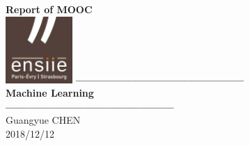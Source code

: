 \documentclass[a4paper]{article}
\begin{document}
\hypersetup{pageanchor=false,
             bookmarksnumbered=true,
             pdfencoding=unicode
            }
\begin{titlepage}
\vspace*{7cm}
\begin{center}%
{\LARGE \textbf{Report of MOOC} }\\
\vskip 1cm
\includegraphics[width=1in]{Logo_ENSIIE.png}
\vskip 1cm
{\Huge \textbf{---------------------------------------------} }\\
\vskip 0.5cm
{\Huge \textbf{Machine Learning} }\\
\vskip 0.5cm
{\Huge \textbf{---------------------------------------------} }\\
\vskip 1cm
\vspace*{1cm}
{\large Guangyue CHEN}\\
\vspace*{0.5cm}
{\large{2018/12/12}}
\end{center}
\end{titlepage}
\tableofcontents{\LARGE}
\hypersetup{pageanchor=true}


\newpage
\end{document}
